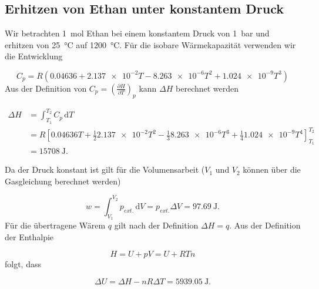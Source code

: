   \subsection{Erhitzen von Ethan unter konstantem Druck}
  
    Wir betrachten \SI[mode=text]{1}{\mole} Ethan bei einem konstantem Druck von \SI[mode=text]{1}{bar} und erhitzen von \SI[mode=text]{25}{\degreeCelsius} auf \SI[mode=text]{1200}{\degreeCelsius}. Für die isobare Wärmekapazität verwenden wir die Entwicklung
    
      \begin{equation}
        C_p = R \left(0.04636 + \num{2.137e-2} T - \num{8.263e-6}T^2 + \num{1.024e-9} T^3\right)
      \end{equation}
      Aus der Definition von $C_p = \left(\frac{\partial H}{\partial T}\right)_p$ kann $\Delta H$ berechnet werden
      
        \begin{equation}
          \begin{split}
            \Delta H &= \int_{T_1}^{T_2} C_p \, \text{d} T \\
                     &= R \left[0.04636 T + \frac{1}{2} \num{2.137e-2} T^2 - \frac{1}{3} \num{8.263e-6}T^3 + \frac{1}{4} \num{1.024e-9} T^4\right]_{T_1}^{T_2} \\
                     &= \SI[mode=text]{15708}{\joule}.
          \end{split}
        \end{equation}
      
      Da der Druck konstant ist gilt für die Volumensarbeit ($V_1$ und $V_2$ können über die Gasgleichung berechnet werden)
      
        \begin{equation}
          w = \int_{V_1}^{V_2} p_{ext.} \, \text{d} V = p_{ext.} \Delta V = \SI[mode=text]{97.69}{\joule}.      
        \end{equation}
      Für die übertragene Wärem $q$ gilt nach der Definition $\Delta H = q$. Aus der Definition der Enthalpie 
      
        \begin{equation}
          H = U + pV = U + RTn
        \end{equation}
        folgt, dass 
        
        \begin{equation}
          \Delta U = \Delta H - nR \Delta T = \SI[mode=text]{5939.05}{\joule}.
        \end{equation}
      
      
  
    